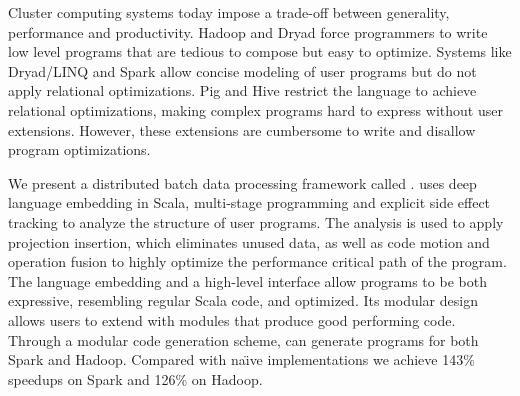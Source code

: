 Cluster computing systems today impose a trade-off between generality,
performance and productivity. Hadoop and Dryad force programmers to write low
level programs that are tedious to compose but easy to optimize. Systems like
Dryad/LINQ and Spark allow concise modeling of user programs but do not apply
relational optimizations. Pig and Hive restrict the language to achieve
relational optimizations, making complex programs hard to express without user
extensions. However, these extensions are cumbersome to write and disallow
program optimizations.

We present a distributed batch data processing framework called \tool.
\tool uses deep language embedding in Scala, multi-stage programming and
explicit side effect tracking to analyze the structure of user programs. The
analysis is used to apply projection insertion, which eliminates unused data, as
well as code motion and operation fusion to highly optimize the performance
critical path of the program. The language embedding and a high-level interface
allow \tool programs to be both expressive, resembling regular Scala code, and
optimized. Its modular design allows users to extend \tool with modules that
produce good performing code. Through a modular code generation
scheme, \tool can generate programs for both Spark and Hadoop. Compared with na\"{\i}ve
implementations we achieve 143\% speedups on Spark and 126\% on Hadoop.